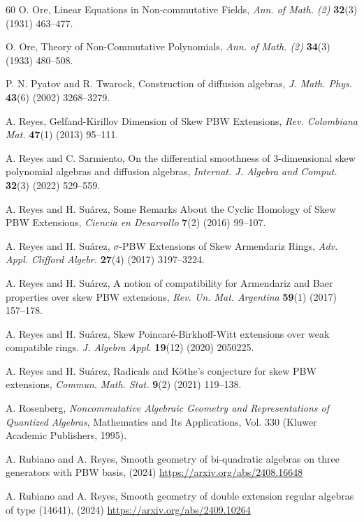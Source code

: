 \documentclass{amsart}
\theoremstyle{definition}
\theoremstyle{remark}
\numberwithin{equation}{section}
\begin{document}
\begin{thebibliography}{60}
O. Ore, Linear Equations in Non-commutative Fields, {\em Ann. of Math. (2)} {\bf 32}(3) (1931) 463--477.

O. Ore, Theory of Non-Commutative Polynomials, {\em Ann. of Math. (2)} {\bf 34}(3) (1933) 480--508.

 P. N. Pyatov and R. Twarock, Construction of diffusion algebras, {\em J. Math. Phys.} {\bf 43}(6) (2002) 3268--3279.

A. Reyes, Gelfand-Kirillov Dimension of Skew PBW Extensions, {\em Rev. Colombiana Mat.} {\bf 47}(1) (2013) 95--111.

 A. Reyes and C. Sarmiento, On the differential smoothness of 3-dimensional skew polynomial algebras and diffusion algebras, {\em Internat. J. Algebra and Comput.} {\bf 32}(3) (2022) 529--559.

 A. Reyes and H. Su\'arez, Some Remarks About the Cyclic Homology of Skew PBW Extensions, {\em Ciencia en Desarrollo} {\bf 7}(2) (2016) 99--107.

 A. Reyes and H. Su\'arez, $\sigma$-{P}{B}{W} Extensions of Skew {A}rmendariz Rings, {\em Adv. Appl. Clifford Algebr.}  {\bf 27}(4) (2017) 3197--3224.

 A. Reyes and H. Su\'arez, A notion of compatibility for {A}rmendariz and {B}aer properties over skew {P}{B}{W} extensions, {\em Rev. Un. Mat. Argentina}  {\bf 59}(1) (2017) 157--178.

 A. Reyes and H. Su\'arez, Skew Poincar\'e-Birkhoff-Witt extensions over weak compatible rings. {\em J. Algebra Appl.} {\bf 19}(12) (2020) 2050225.

 A. Reyes and H. Su\'arez, Radicals and {K}\"othe's conjecture for skew {P}{B}{W} extensions, {\em Commun. Math. Stat.} {\bf 9}(2) (2021) 119--138.

 A. Rosenberg, {\em Noncommutative Algebraic Geometry and Representations of Quantized Algebras}, Mathematics and Its Applications, Vol. 330 (Kluwer Academic Publishers, 1995).

 A. Rubiano and A. Reyes, Smooth geometry of bi-quadratic algebras on three generators with PBW basis, (2024) \url{https://arxiv.org/abs/2408.16648}

 A. Rubiano and A. Reyes,  Smooth geometry of double extension regular algebras of type (14641), (2024) \url{https://arxiv.org/abs/2409.10264}


\end{thebibliography}
\end{document}
